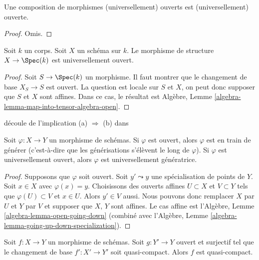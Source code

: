 \begin{lemma}
\label{lemma-composition-open}
Une composition de morphismes (universellement) ouverts est (universellement) ouverte.
\end{lemma}

\begin{proof}
Omis.
\end{proof}

\begin{lemma}
\label{lemma-scheme-over-field-universally-open}
Soit $k$ un corps. Soit $X$ un schéma sur $k$.
Le morphisme de structure $X \to \Spec(k)$ est universellement ouvert.
\end{lemma}

\begin{proof}
Soit $S \to \Spec(k)$ un morphisme. Il faut
montrer que le changement de base $X_S \to S$ est ouvert.
La question est locale sur $S$ et $X$, on peut
donc supposer que $S$ et $X$ sont affines.
Dans ce cas, le résultat est Algèbre, Lemme \ref{algebra-lemma-map-into-tensor-algebra-open}.
\end{proof}

\begin{lemma}
\label{lemma-open-generizing}
\begin{reference}
découle de l'implication (a) $\Rightarrow$ (b) dans \cite[IV, Corollaire
1.10.4]{EGA}
\end{reference}
Soit $\varphi : X \to Y$ un morphisme de schémas. Si $\varphi$ est ouvert,
alors $\varphi$ est en train de générer (c'est-à-dire que
les générisations s'élèvent le long de $\varphi$). Si
$\varphi$ est universellement ouvert, alors $\varphi$ est universellement
génératrice.
\end{lemma}

\begin{proof}
Supposons que $\varphi$ soit
ouvert. Soit $y' \leadsto y$ une spécialisation de points de
$Y$. Soit $x \in X$ avec $\varphi(x) = y$.
Choisissons des ouverts affines $U \subset X$ et $V \subset Y$
tels que $\varphi(U) \subset V$ et $x \in U$. Alors $y' \in V$ aussi. Nous pouvons
donc remplacer $X$ par $U$ et $Y$ par $V$
et supposer
que $X$, $Y$ sont affines. Le cas affine
est l'Algèbre,
Lemme \ref{algebra-lemma-open-going-down} (combiné avec l'Algèbre, Lemme \ref{algebra-lemma-going-up-down-specialization}).
\end{proof}

\begin{lemma}
\label{lemma-descent-quasi-compact}
Soit $f : X \to Y$ un morphisme de schémas. Soit
$g : Y' \to Y$ ouvert et surjectif tel que le changement de base $f' : X' \to Y'$
soit quasi-compact. Alors $f$ est quasi-compact.
\end{lemma}

